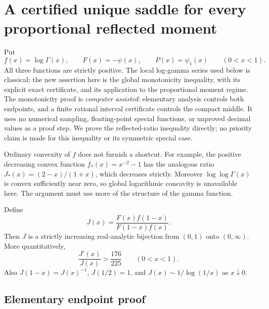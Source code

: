 \section{A certified unique saddle for every proportional reflected moment}
\label{gs:sec:main}

Put
\[
 f(x)=\log\Gamma(x),\qquad F(x)=-\psi(x),\qquad P(x)=\psi_1(x)
 \qquad(0<x<1).
\]
All three functions are strictly positive. The local log-gamma series
used below is classical; the new assertion here is the global
monotonicity inequality, with its explicit exact certificate, and its
application to the proportional moment regime. The monotonicity proof
is \emph{computer assisted}: elementary analysis controls both endpoints,
and a finite rational interval certificate controls the compact middle.
It uses no numerical sampling, floating-point special functions, or
unproved decimal values as a proof step. We prove the reflected-ratio
inequality directly; no priority claim is made for this inequality or
its symmetric special case.

Ordinary convexity of $f$ does not furnish a shortcut. For example,
the positive decreasing convex function $f_*(x)=x^{-2}-1$ has the
analogous ratio $J_*(x)=(2-x)/(1+x)$, which decreases strictly.
Moreover $\log\log\Gamma(x)$ is convex sufficiently near zero, so
global logarithmic concavity is unavailable here. The argument must
use more of the structure of the gamma function.

\begin{theorem}
\label{gs:thm:monotonicity}
Define
\[
 J(x)=\frac{F(x)f(1-x)}{F(1-x)f(x)}.
\]
Then $J$ is a strictly increasing real-analytic bijection from $(0,1)$
onto $(0,\infty)$. More quantitatively,
\begin{equation}\label{gs:eq:global-derivative}
 \frac{J'(x)}{J(x)}>\frac{176}{225}\qquad(0<x<1).
\end{equation}
Also $J(1-x)=J(x)^{-1}$, $J(1/2)=1$, and
$J(x)\sim1/\log(1/x)$ as $x\downarrow0$.
\end{theorem}

\subsection{Elementary endpoint proof}

